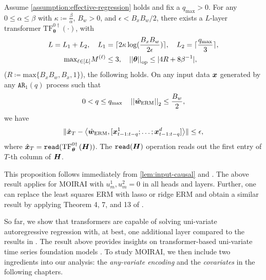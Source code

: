 \begin{proposition}
    Assume \cref{assumption:effective-regression} holds and fix a $q_{\max} > 0$.
    For any $0 \leq \alpha \leq \beta$ with $\kappa \coloneqq \frac{\beta}{\alpha}$, $B_w > 0$, and $\epsilon < B_x B_w / 2$,
    there exists a $L$-layer transformer
     $\text{TF}_{\bm{\theta}}^{0 \dagger} 
    \left( \cdot \right)$, with
    \begin{align*}
        L = L_1 + L_2, \quad
        L_1& = \lceil 2 \kappa \log( \frac{B_x B_w}{2 \epsilon} ) \rceil,
        \quad
        L_2 = \lceil \frac{q_{\max}}{3} \rceil,
        \\
        \text{max}_{\ell \in [L]} 
        M^{(\ell)} 
        &\leq 3,
        \quad
        \left\lvert \left\lvert \bm{\theta} \right\rvert \right\rvert_{\text{op}}
        \leq
        | 4R + 8\beta^{-1} |
        ,
    \end{align*}
    ($R \coloneqq \text{max}\{ B_x B_w, B_x, 1 \}$), the following holds.
    On any input data $\bm{x}$ generated by any $\mathtt{AR}_1(q)$ process such that
    \begin{equation}
        0 < q \leq q_{\max}
        \quad
       \left\lvert \left\lvert \hat{\bm{w}}_{\text{ERM}} \right\rvert \right\rvert_2
       \leq 
       \frac{B_w}{2},
    \end{equation}
    we have
    \begin{equation}
        \lVert
        \hat{\bm{x}}_{T}
        -
        \left\langle
        \hat{\bm{w}}_{\text{ERM}}, 
        [
        \bm{x}_{t-1:t-q}^1 ; \dots 
        ; \bm{x}_{t-1:t-q}^d
        ]
        \right\rangle
        \rVert
        \leq 
        \epsilon,
    \end{equation}
    where 
    $\hat{\bm{x}}_{T} = \mathtt{read}(\text{TF}_{\bm{\theta}}^{0 \dagger}
    \left( \boldsymbol{H} \right))$.
    The $\mathtt{read}(\boldsymbol{H})$ operation reads out the first entry of $T$-th column of $\boldsymbol{H}$.
\end{proposition}
This proposition follows immediately from \cref{lem:input-causal} and \citep[Theorem~4]{bai2024transformers}.
The above result applies for MOIRAI with $u^1_m, u^2_m = 0$ in all heads and layers.
Further, one can replace the least squares ERM with lasso or ridge ERM and obtain a similar result by applying Theorem 4, 7, and 13 of \cite{bai2024transformers}.

So far, we show that transformers are capable of solving uni-variate autoregressive regression with, at best, one additional layer compared to the results in \cite{bai2024transformers}.
The result above provides insights on transformer-based uni-variate time series foundation models \cite{ansari2024chronos, rasul2023lag, das2023decoder}.
To study MOIRAI, we then include two ingredients into our analysis: the \textit{any-variate encoding} and the \textit{covariates} in the following chapters.

